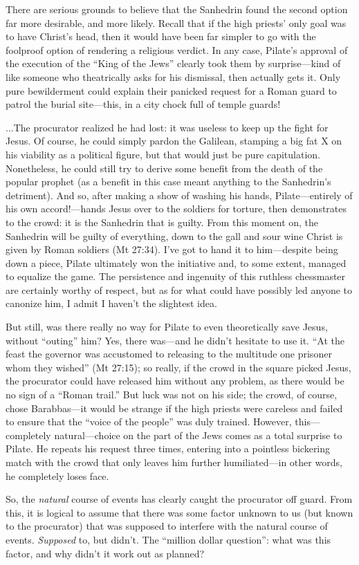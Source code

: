 There are serious grounds to believe that the Sanhedrin found the second option far more desirable, and more likely. Recall that if the high priests' only goal was to have Christ's head, then it would have been far simpler to go with the foolproof option of rendering a religious verdict. In any case, Pilate's approval of the execution of the ``King of the Jews'' clearly took them by surprise---kind of like someone who theatrically asks for his dismissal, then actually gets it. Only pure bewilderment could explain their panicked request for a Roman guard to patrol the burial site---this, in a city chock full of temple guards!

...The procurator realized he had lost: it was useless to keep up the fight for Jesus. Of course, he could simply pardon the Galilean, stamping a big fat X on his viability as a political figure, but that would just be pure capitulation. Nonetheless, he could still try to derive some benefit from the death of the popular prophet (as a benefit in this case meant anything to the Sanhedrin's detriment). And so, after making a show of washing his hands, Pilate---entirely of his own accord!---hands Jesus over to the soldiers for torture, then demonstrates to the crowd: it is the Sanhedrin that is guilty. From this moment on, the Sanhedrin will be guilty of everything, down to the gall and sour wine Christ is given by Roman soldiers (Mt 27:34). I've got to hand it to him---despite being down a piece, Pilate ultimately won the initiative and, to some extent, managed to equalize the game. The persistence and ingenuity of this ruthless chessmaster are certainly worthy of respect, but as for what could have possibly led anyone to canonize him, I admit I haven't the slightest idea.

But still, was there really no way for Pilate to even theoretically save Jesus, without ``outing'' him? Yes, there was---and he didn't hesitate to use it. ``At the feast the governor was accustomed to releasing to the multitude one prisoner whom they wished'' (Mt 27:15); so really, if the crowd in the square picked Jesus, the procurator could have released him without any problem, as there would be no sign of a ``Roman trail.'' But luck was not on his side; the crowd, of course, chose Barabbas---it would be strange if the high priests were careless and failed to ensure that the ``voice of the people'' was duly trained. However, this---completely natural---choice on the part of the Jews comes as a total surprise to Pilate. He repeats his request three times, entering into a pointless bickering match with the crowd that only leaves him further humiliated---in other words, he completely loses face.

So, the \emph{natural} course of events has clearly caught the procurator off guard. From this, it is logical to assume that there was some factor unknown to us (but known to the procurator) that was supposed to interfere with the natural course of events. \emph{Supposed} to, but didn't. The ``million dollar question'': what was this factor, and why didn't it work out as planned?
